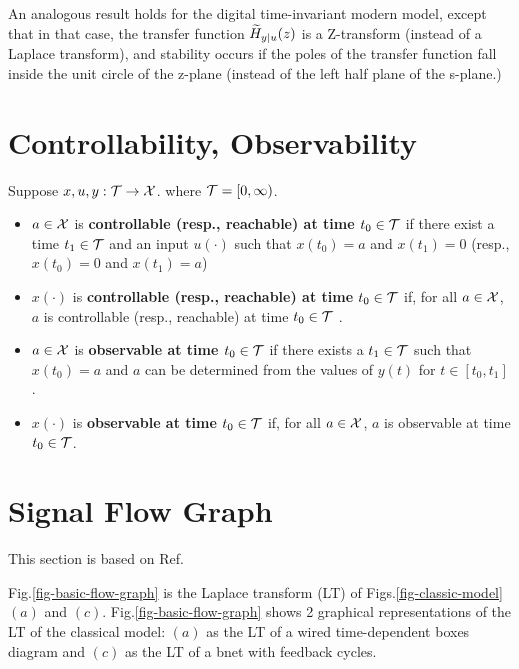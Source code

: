 An analogous result holds for the
digital time-invariant 
modern model,
except that in that case,
the transfer function ${\widetilde{H}}_{y|u}(z)$
is a Z-transform (instead of a Laplace
transform), and stability
occurs if the poles of the transfer
function fall inside the unit circle 
of the z-plane (instead
of the left half plane
of the s-plane.)



\section{
Controllability,
Observability}
Suppose $x, u, y:{\cal T}\rightarrow {\cal X}$.
 where ${\cal T}=[0, \infty)$.
 
 \begin{itemize}
 \item
$a\in{\cal X}$ is {\bf controllable
(resp., reachable) at time $t_0\in{\cal T}$
}
if there exist a time
$t_1\in{\cal T}$ and an input $u(\cdot)$ such that $x(t_0)=a$
and $x(t_1)=0$ (resp., $x(t_0)=0$ and $x(t_1)=a$)
\item
$x(\cdot)$ is {\bf controllable 
(resp., reachable)
at time $t_0\in{\cal T}$}
if, for all $a\in{\cal X}$, 
 $a$ is controllable 
(resp., reachable)
at time $t_0\in{\cal T}$ .
\item
$a\in{\cal X}$ is {\bf observable at time $t_0\in{\cal T}$}
if there exists a $t_1\in {\cal T}$
such that 
$x(t_0)=a$
and $a$
can be determined from
the values of 
$y(t)$ for $t\in [t_0, t_1]$.
\item
$x(\cdot)$ is {\bf observable
at time $t_0\in{\cal T}$ } 
if,
for all $a\in {\cal X}$, $a$ is 
observable 
at time $t_0\in{\cal T}$.
\end{itemize}

\section{Signal Flow Graph}
This section is based on Ref.\cite{wiki-signal-flow}

Fig.\ref{fig-basic-flow-graph}
is 
the Laplace transform (LT)
of Figs.\ref{fig-classic-model} 
$(a)$ and $(c)$.
Fig.\ref{fig-basic-flow-graph} shows 2
graphical representations 
of the
LT of the
classical
model:
$(a)$ as the LT of a wired time-dependent boxes diagram and $(c)$
as the LT of a bnet with feedback cycles.


